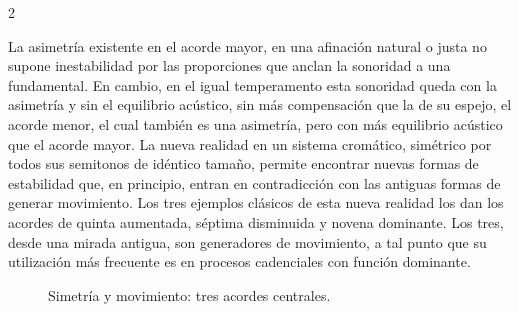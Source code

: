 \documentclass[a4paper,11pt]{article}
\begin{document}
\begin{multicols}{2}
\bigskip

La asimetría existente en el acorde mayor, en una afinación natural o justa no supone inestabilidad por las proporciones que anclan la sonoridad a una fundamental. En cambio, en el igual temperamento esta sonoridad queda con la asimetría y sin el equilibrio acústico, sin más compensación que la de su espejo, el acorde menor, el cual también es una asimetría, pero con más equilibrio acústico que el acorde mayor. La nueva realidad en un sistema cromático, simétrico por todos sus semitonos de idéntico tamaño, permite encontrar nuevas formas de estabilidad que, en principio, entran en contradicción con las antiguas formas de generar movimiento. Los tres ejemplos clásicos de esta nueva realidad los dan los acordes de quinta aumentada, séptima disminuida y novena dominante. Los tres, desde una mirada antigua, son generadores de movimiento, a tal punto que su utilización más frecuente es en procesos cadenciales con función dominante.
\end{multicols}

\begin{figure}[ht]
\centering
\caption{Simetría y movimiento: tres acordes centrales.}\label{fig:+5-7dim-9D}
\end{figure}
\end{document}
